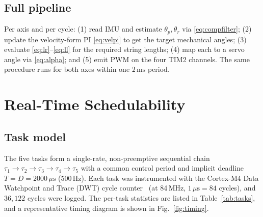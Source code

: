 \documentclass[conference]{IEEEtran}
\begin{document}
\subsection{Full pipeline}
Per axis and per cycle: (1) read IMU and estimate $\theta_p,\theta_r$ via
\eqref{eq:compfilter}; (2) update the velocity-form PI \eqref{eq:velpi} to get
the target mechanical angles; (3) evaluate \eqref{eq:lr}--\eqref{eq:ll} for the
required string lengths; (4) map each to a servo angle via \eqref{eq:alpha}; and
(5) emit PWM on the four TIM2 channels. The same procedure runs for both axes
within one $2\,\text{ms}$ period.

\section{Real-Time Schedulability}
\label{sec:rt}
\subsection{Task model}
The five tasks form a single-rate, non-preemptive sequential chain
$\tau_1\!\rightarrow\!\tau_2\!\rightarrow\!\tau_3\!\rightarrow\!\tau_4\!\rightarrow\!\tau_5$
with a common control period and implicit deadline $T = D = 2000\,\mu\text{s}$
(500\,Hz). Each task was instrumented with the Cortex-M4 Data Watchpoint and
Trace (DWT) cycle counter~\cite{arm2010cortexm4} (at 84\,MHz, $1\,\mu\text{s} =
84$ cycles), and $36{,}122$ cycles were logged. The per-task statistics are listed in
Table~\ref{tab:tasks}, and a representative timing diagram is shown in
Fig.~\ref{fig:timing}.
\end{document}
